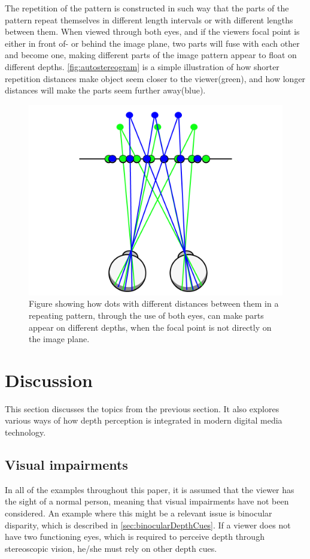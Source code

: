The repetition of the pattern is constructed in such way that the parts of the pattern repeat themselves in different length intervals or with different lengths between them. When viewed through both eyes, and if the viewers focal point is either in front of- or behind the image plane, two parts will fuse with each other and become one, making different parts of the image pattern appear to float on different depths\citep{autostereogramNguyen}. \autoref{fig:autostereogram} is a simple illustration of how shorter repetition distances make object seem closer to the viewer(green), and how longer distances will make the parts seem further away(blue). 

\begin{figure}[H]
	\centering
	\includegraphics[width=0.75\linewidth]{figure/Analysis/autoStereogram.png}
	\caption{Figure showing how dots with different distances between them in a repeating pattern, through the use of both eyes, can make parts appear on different depths, when the focal point is not directly on the image plane.}
	\label{fig:autostereogram}
\end{figure}

\section{Discussion}
This section discusses the topics from the previous section. It also explores various ways of how depth perception is integrated in modern digital media technology.

	\subsection{Visual impairments}
	In all of the examples throughout this paper, it is assumed that the viewer has the sight of a normal person, meaning that visual impairments have not been considered. An example where this might be a relevant issue is binocular disparity, which is described in \autoref{sec:binocularDepthCues}. If a viewer does not have two functioning eyes, which is required to perceive depth through stereoscopic vision, he/she must rely on other depth cues.

